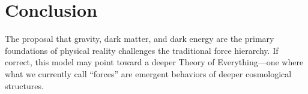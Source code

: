 \documentclass[aps,prd,twocolumn,superscriptaddress,nofootinbib]{revtex4-2}
\begin{document}
\section{Conclusion}
The proposal that gravity, dark matter, and dark energy are the primary foundations of physical reality challenges the traditional force hierarchy. If correct, this model may point toward a deeper Theory of Everything---one where what we currently call ``forces'' are emergent behaviors of deeper cosmological structures.
\end{document}
